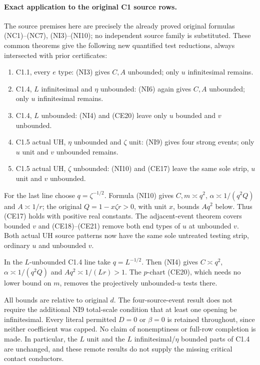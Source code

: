 \paragraph{Exact application to the original C1 source rows.}
The source premises here are precisely the already proved original
formulas (NC1)--(NC7), (NI3)--(NI10); no independent source family is
substituted. These common theorems give the following new quantified
test reductions, always intersected with prior certificates:
\begin{enumerate}
\item C1.1, every $e$ type: (NI3) gives $C,A$ unbounded;
only $u$ infinitesimal remains.
\item C1.4, $L$ infinitesimal and $\eta$ unbounded: (NI6)
again gives $C,A$ unbounded; only $u$ infinitesimal remains.
\item C1.4, $L$ unbounded: (NI4) and (CE20) leave only
$u$ bounded and $v$ unbounded.
\item C1.5 actual UH, $\eta$ unbounded and $\zeta$ unit:
(NI9) gives four strong events; only $u$ unit and $v$ unbounded remains.
\item C1.5 actual UH, $\zeta$ unbounded: (NI10) and (CE17)
leave the same sole strip, $u$ unit and $v$ unbounded.
\end{enumerate}
For the last line choose $q=\zeta^{-1/2}$. Formula (NI10) gives
$C,m\asymp q^2$, $\alpha\asymp1/(q^2Q)$ and $A\asymp1/r$;
the original $Q=1-x\zeta r>0$, with unit $x$, bounds $Aq^2$ below.
Thus (CE17) holds with positive real constants. The adjacent-event
theorem covers bounded $v$ and (CE18)--(CE21) remove both end types of
$u$ at unbounded $v$. Both actual UH source patterns now have the same
sole untreated testing strip, ordinary $u$ and unbounded $v$.

In the $L$-unbounded C1.4 line take $q=L^{-1/2}$.
Then (NI4) gives $C\asymp q^2$, $\alpha\asymp1/(q^2Q)$ and
$Aq^2\asymp1/(Lr)>1$. The $p$-chart (CE20), which needs no lower
bound on $m$, removes the projectively unbounded-$u$ tests there.

All bounds are relative to original $d$. The four-source-event result
does not require the additional NI9 total-scale condition that at least
one opening be infinitesimal. Every literal permitted $D=0$ or
$\beta=0$ is retained throughout, since neither coefficient was capped.
No claim of nonemptiness or full-row completion is made. In particular,
the $L$ unit and the $L$ infinitesimal/$\eta$ bounded parts of C1.4 are
unchanged, and these remote results do not supply the missing critical
contact conductors.



